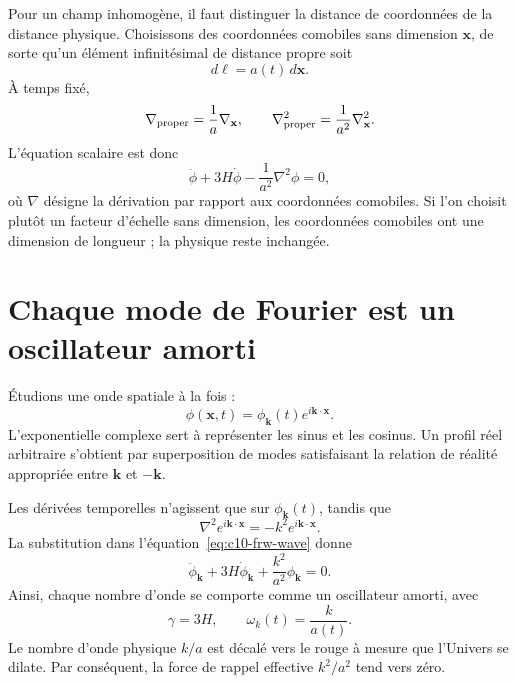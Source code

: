 Pour un champ inhomogène, il faut distinguer la distance de coordonnées de la distance physique. Choisissons des coordonnées comobiles sans dimension \(\mathbf x\), de sorte qu’un élément infinitésimal de distance propre soit
\[
d\boldsymbol\ell=a(t)\,d\mathbf x.
\]
À temps fixé,
\[
\nabla_{\rm proper}=\frac{1}{a}\nabla_{\mathbf x},
\qquad
\nabla_{\rm proper}^2=\frac{1}{a^2}\nabla_{\mathbf x}^2.
\]
L’équation scalaire est donc
\begin{equation}
\ddot\phi+3H\dot\phi-\frac{1}{a^2}\nabla^2\phi=0,
\label{eq:c10-frw-wave}
\end{equation}
où \(\nabla\) désigne la dérivation par rapport aux coordonnées comobiles. Si l’on choisit plutôt un facteur d’échelle sans dimension, les coordonnées comobiles ont une dimension de longueur ; la physique reste inchangée.

\begin{classroomqa}
\end{classroomqa}

\section{Chaque mode de Fourier est un oscillateur amorti}

Étudions une onde spatiale à la fois :
\begin{equation}
\phi(\mathbf x,t)
=\phi_{\mathbf k}(t)e^{i\mathbf k\cdot\mathbf x}.
\label{eq:c10-mode-ansatz}
\end{equation}
L’exponentielle complexe sert à représenter les sinus et les cosinus. Un profil réel arbitraire s’obtient par superposition de modes satisfaisant la relation de réalité appropriée entre \(\mathbf k\) et \(-\mathbf k\).

Les dérivées temporelles n’agissent que sur \(\phi_{\mathbf k}(t)\), tandis que
\[
\nabla^2e^{i\mathbf k\cdot\mathbf x}
=-k^2e^{i\mathbf k\cdot\mathbf x}.
\]
La substitution dans l’équation~\eqref{eq:c10-frw-wave} donne
\begin{equation}
\ddot\phi_{\mathbf k}
+3H\dot\phi_{\mathbf k}
+\frac{k^2}{a^2}\phi_{\mathbf k}=0.
\label{eq:c10-mode-equation}
\end{equation}
Ainsi, chaque nombre d’onde se comporte comme un oscillateur amorti, avec
\begin{equation}
\gamma=3H,
\qquad
\omega_k(t)=\frac{k}{a(t)}.
\label{eq:c10-mode-identification}
\end{equation}
Le nombre d’onde physique \(k/a\) est décalé vers le rouge à mesure que l’Univers se dilate. Par conséquent, la force de rappel effective \(k^2/a^2\) tend vers zéro.

